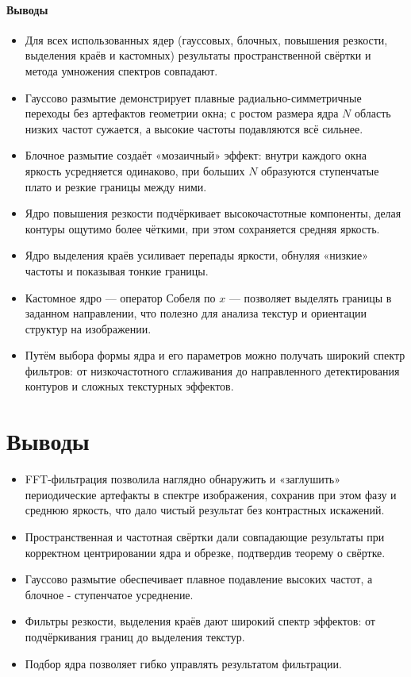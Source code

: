 \documentclass[a4paper]{article}
\newcommand{\addsection}[1]{
    \phantomsection
    \addcontentsline{toc}{section}{#1}
    \section*{#1}
}
\begin{document}
\paragraph{Выводы}
\begin{itemize}
  \item Для всех использованных ядер (гауссовых, блочных, повышения резкости, выделения краёв и кастомных) результаты пространственной свёртки и метода умножения спектров совпадают.
  \item Гауссово размытие демонстрирует плавные радиально-симметричные переходы без артефактов геометрии окна; с ростом размера ядра $N$ область низких частот сужается, а высокие частоты подавляются всё сильнее.
  \item Блочное размытие создаёт «мозаичный» эффект: внутри каждого окна яркость усредняется одинаково, при больших $N$ образуются ступенчатые плато и резкие границы между ними.
  \item Ядро повышения резкости подчёркивает высокочастотные компоненты, делая контуры ощутимо более чёткими, при этом сохраняется средняя яркость.
  \item Ядро выделения краёв усиливает перепады яркости, обнуляя «низкие» частоты и показывая тонкие границы.
  \item Кастомное ядро — оператор Собеля по $x$ — позволяет выделять границы в заданном направлении, что полезно для анализа текстур и ориентации структур на изображении.
  \item Путём выбора формы ядра и его параметров можно получать широкий спектр фильтров: от низкочастотного сглаживания до направленного детектирования контуров и сложных текстурных эффектов.
\end{itemize}

\addsection{Выводы}
\begin{itemize}
  \item FFT-фильтрация позволила наглядно обнаружить и «заглушить» периодические артефакты в спектре изображения, сохранив при этом фазу и среднюю яркость, что дало чистый результат без контрастных искажений.
  \item Пространственная и частотная свёртки дали совпадающие результаты при корректном центрировании ядра и обрезке, подтвердив теорему о свёртке.
  \item Гауссово размытие обеспечивает плавное подавление высоких частот, а блочное - ступенчатое усреднение.
  \item Фильтры резкости, выделения краёв дают широкий спектр эффектов: от подчёркивания границ до выделения текстур.
  \item Подбор ядра позволяет гибко управлять результатом фильтрации.
\end{itemize}
\end{document}
